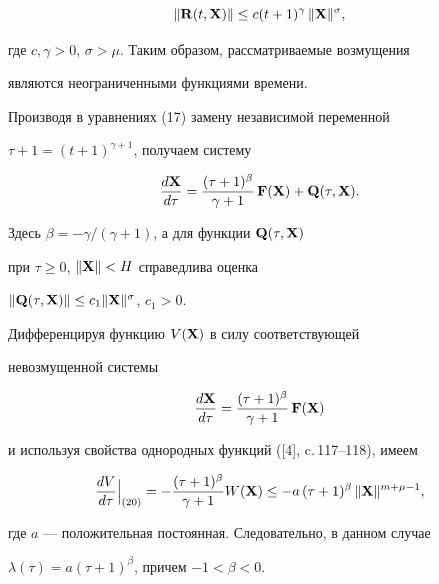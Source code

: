 \begin{equation}


\|\bold R(t,\bold X)\|\leq c (t+1)^\gamma \, \|\bold X\|^\sigma,


\end{equation}


где $c, \gamma >0$, $\sigma>\mu$. Таким образом, рассматриваемые возмущения


являются неограниченными функциями времени.





Производя в уравнениях (17) замену независимой переменной


$\tau+1=(t+1)^{\gamma+1}$, получаем систему


\begin{equation}


\frac{d \bold X}{d\tau}=\frac{(\tau+1)^\beta}{\gamma+1} \,


\bold F(\bold X)+ \bold Q(\tau,\bold X).


\end{equation}


Здесь $\beta=-\gamma/(\gamma+1)$, а для функции $\bold Q(\tau,\bold X)$


при $\tau\geq 0$, $\|\bold X\|< H$ справедлива оценка


$\|\bold Q(\tau,\bold X)\|\leq c_1 \|\bold X\|^\sigma$, $c_1>0$.





Дифференцируя функцию $V(\bold X)$ в силу соответствующей


невозмущенной системы


\begin{equation}


\frac{d \bold X}{d\tau}=\frac{(\tau+1)^\beta}{\gamma+1} \, \bold F(\bold X)


\end{equation}


и используя свойства однородных функций ([4], c.\,117--118), имеем


$$


\frac{dV}{d\tau} \Big|_{(20)} = -\frac{(\tau+1)^\beta}{\gamma+1}


W(\bold X)\leq -a \, (\tau+1)^\beta \, \|\bold X\|^{m+\mu-1},


$$


где $a$ --- положительная постоянная. Следовательно, в данном случае


$\lambda(\tau)=a(\tau+1)^\beta$, причем $-1<\beta<0$.





